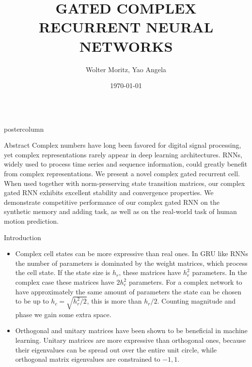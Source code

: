 \documentclass{beamer}
\title{GATED COMPLEX RECURRENT NEURAL NETWORKS}
\author{Wolter Moritz, Yao Angela}
\institute[ETH]{Institute for Computer Science, Bonn University}
\date{\today}
\newlength{\columnheight}
\begin{document}
\begin{frame}
\begin{columns}
    \begin{column}{.43\textwidth}
        \begin{beamercolorbox}[center]{postercolumn}
            \begin{minipage}{.98\textwidth}  %
                \parbox[t][\columnheight]{\textwidth}{ %
                    \begin{myblock}{Abstract}
                        Complex numbers have long been favored for digital signal processing, yet complex representations rarely appear in deep learning architectures.  RNNs, widely used to process time series and sequence information, could greatly benefit from complex representations.  We present a novel complex gated recurrent cell.  When used together with norm-preserving state transition matrices, our complex gated RNN exhibits excellent stability and convergence properties.  We demonstrate competitive performance of our complex gated RNN on the synthetic memory and adding task, as well as on the real-world task of human motion prediction.
                    \end{myblock}\vfill
                    \begin{myblock}{Introduction}
                        \begin{itemize}
                            \item Complex cell states can be more expressive than real ones. In GRU like RNNs the number of parameters is dominated by the weight matrices, which process the cell state. If the state size is $h_r$, these matrices have $h_r^2$ parameters. In the complex case these matrices have $2h_c^2$ parameters. For a complex network to have approximately the same amount of parameters the state can be chosen to be up to  $h_c = \sqrt{h_r^2/2}$, this is more than $h_r/2$. Counting magnitude and phase we gain some extra space.
                            \item Orthogonal and unitary matrices have been shown to be beneficial in machine learning\cite{Arjovsky,Wisdom,Hyland}. Unitary matrices are more 
                                  expressive than orthogonal ones, because their eigenvalues can be spread out over the entire unit circle, while orthogonal matrix eigenvalues are
                                  constrained to $-1, 1$.
                        \end{itemize}

\end{myblock}}
\end{minipage}
\end{beamercolorbox}
\end{column}
\end{columns}
\end{frame}
\end{document}
